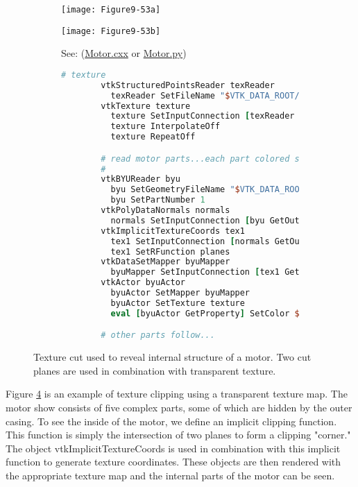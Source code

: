 \begin{figure}[htb]
    \centering
	\begin{subfigure}[h]{0.38\linewidth}
		\texttt{[image: Figure9-53a]}
		\captionsetup{justification=centering}
		\caption*{}
		\label{fig:Figure9-53a}
	\end{subfigure}
	\hfill
	\begin{subfigure}[h]{0.38\linewidth}
		\texttt{[image: Figure9-53b]}
		\captionsetup{justification=centering}
		\caption*{See: (\href{https://lorensen.github.io/VTKExamples/site/Cxx/VisualizationAlgorithms/Motor/}{Motor.cxx} or \href{https://lorensen.github.io/VTKExamples/site/Python/VisualizationAlgorithms/Motor/}{Motor.py})}
        \label{fig:Figure9-53b}
	\end{subfigure}
	\hfill
	\begin{subfigure}[h]{0.76\linewidth}
        \begin{lstlisting}[language=TCL,  caption={}, numbers=none, frame=none]
        # texture
        vtkStructuredPointsReader texReader
          texReader SetFileName "$VTK_DATA_ROOT/Data/texThres2.vtk"
        vtkTexture texture
          texture SetInputConnection [texReader GetOutputPort]
          texture InterpolateOff
          texture RepeatOff

        # read motor parts...each part colored separately
        #
        vtkBYUReader byu
          byu SetGeometryFileName "$VTK_DATA_ROOT/Data/motor.g"
          byu SetPartNumber 1
        vtkPolyDataNormals normals
          normals SetInputConnection [byu GetOutputPort]
        vtkImplicitTextureCoords tex1
          tex1 SetInputConnection [normals GetOutputPort]
          tex1 SetRFunction planes
        vtkDataSetMapper byuMapper
          byuMapper SetInputConnection [tex1 GetOutputPort]
        vtkActor byuActor
          byuActor SetMapper byuMapper
          byuActor SetTexture texture
          eval [byuActor GetProperty] SetColor $cold_grey

        # other parts follow...
        \end{lstlisting}
        \label{fig:Figure9-53d}
	\end{subfigure}
	\caption{Texture cut used to reveal internal structure of a motor. Two cut planes are used in combination with transparent texture.}\label{fig:Figure9-53}
\end{figure}

Figure \ref{fig:Figure9-53} is an example of texture clipping using a transparent texture map. The motor show consists of five complex parts, some of which are hidden by the outer casing. To see the inside of the motor, we define an implicit clipping function. This function is simply the intersection of two planes to form a clipping "corner." The object vtkImplicitTextureCoords is used in combination with this implicit function to generate texture coordinates. These objects are then rendered with the appropriate texture map and the internal parts of the motor can be seen.

